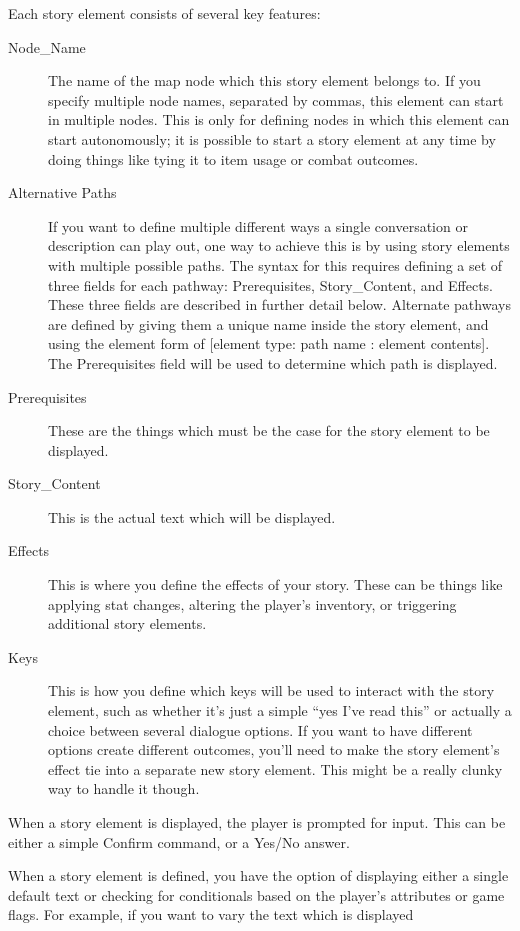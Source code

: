 \documentclass[11pt]{article}
\begin{document}
Each story element consists of several key features:
\begin{description}
	\item[Node_Name] The name of the map node which this story element belongs to. If you specify multiple node names, separated by commas, this element can start in multiple nodes. This is only for defining nodes in which this element can start autonomously; it is possible to start a story element at any time by doing things like tying it to item usage or combat outcomes.
	\item[Alternative Paths] If you want to define multiple different ways a single conversation or description can play out, one way to achieve this is by using story elements with multiple possible paths. The syntax for this requires defining a set of three fields for each pathway: Prerequisites, Story_Content, and Effects. These three fields are described in further detail below. Alternate pathways are defined by giving them a unique name inside the story element, and using the element form of [element type: path name : element contents]. The Prerequisites field will be used to determine which path is displayed.
	\item[Prerequisites] These are the things which must be the case for the story element to be displayed.
	\item[Story_Content] This is the actual text which will be displayed.
	\item[Effects] This is where you define the effects of your story. These can be things like applying stat changes, altering the player's inventory, or triggering additional story elements.
	\item[Keys] This is how you define which keys will be used to interact with the story element, such as whether it's just a simple ``yes I've read this'' or actually a choice between several dialogue options. If you want to have different options create different outcomes, you'll need to make the story element's effect tie into a separate new story element. This might be a really clunky way to handle it though.
	
\end{description}

When a story element is displayed, the player is prompted for input.
This can be either a simple Confirm command, or a Yes/No answer.

When a story element is defined, you have the option of displaying either a single default text or checking for conditionals based on the player's attributes or game flags.
For example, if you want to vary the text which is displayed 
\end{document}
